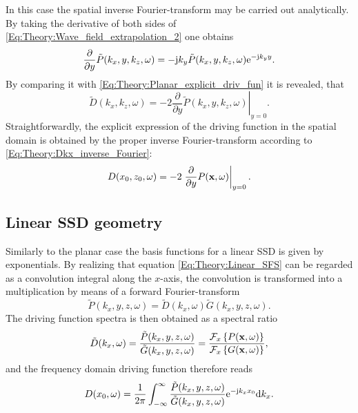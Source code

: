 \vspace{3mm}
In this case the spatial inverse Fourier-transform may be carried out analytically.
By taking the derivative of both sides of \eqref{Eq:Theory:Wave_field_extrapolation_2} one obtains
\begin{equation}
\frac{\partial}{\partial y}  \tilde{P}(k_x,y,k_z,\omega) = - \mathrm{j} k_y  \tilde{P}(k_x,y,k_z,\omega) \mathrm{e}^{-\mathrm{j} k_y y}.
\end{equation}
By comparing it with \eqref{Eq:Theory:Planar_explicit_driv_fun} it is revealed, that 
\begin{equation}
\tilde{D}(k_x,k_z,\omega) = -2 \left. \frac{\partial}{\partial y} \tilde{P}(k_x,y,k_z,\omega) \right|_{y = 0}.
\label{Eq:Theory:Planar_explicit_driv_fun_spatial}
\end{equation}
Straightforwardly, the explicit expression of the driving function in the spatial domain is obtained by the proper inverse Fourier-transform according to \eqref{Eq:Theory:Dkx_inverse_Fourier}:
\begin{equation}
D(x_0,z_0,\omega) = -2 \left. \frac{\partial}{\partial y} P(\mathbf{x},\omega) \right|_{y = 0}.
\label{Eq:Theory:Planar_explicit_driv_fun_spatial}
\end{equation}

\subsection{Linear SSD geometry}

Similarly to the planar case the basis functions for a linear SSD is given by exponentials.
By realizing that equation \eqref{Eq:Theory:Linear_SFS} can be regarded as a convolution integral along the $x$-axis,
the convolution is transformed into a multiplication by means of a forward Fourier-transform
\begin{equation}
\tilde{P}(k_x,y,z, \omega) = \tilde{D}(k_x,\omega)\tilde{G}(k_x,y,z, \omega).
\end{equation}
The driving function spectra is then obtained as a spectral ratio
\begin{equation}
\tilde{D}(k_x,\omega) = \frac{\tilde{P}(k_x,y,z, \omega)}{\tilde{G}(k_x,y,z, \omega)} = \frac{\mathcal{F}_x\left\{ P(\mathbf{x},\omega) \right\}}{\mathcal{F}_x\left\{ G(\mathbf{x},\omega) \right\}},
\end{equation}
and the frequency domain driving function therefore reads
\begin{equation}
D(x_0,\omega) = \frac{1}{2\pi} \int_{-\infty}^{\infty} \frac{\tilde{P}(k_x,y,z, \omega) }{\tilde{G}(k_x,y,z, \omega)} \mathrm{e}^{-\mathrm{j} k_x x_0} \mathrm{d} k_x.
\label{Eq:Theory:LinearSDM1}
\end{equation}

